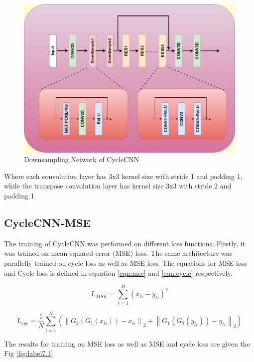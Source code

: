 \begin{figure}[H]
    \centering
    \includegraphics[totalheight=4.5in]{Chapter6/dd_1.png}
    \caption[Downsampling Network of CycleCNN.]{Downsampling Network of CycleCNN}
    \label{fig:label6.2}
\end{figure}
Where each convolution layer has 3x3 kernel size with stride 1 and padding 1, while the transpose convolution layer has kernel size 3x3 with stride 2 and padding 1. 
\subsection{CycleCNN-MSE}
The training of CycleCNN was performed on different loss functions. Firstly, it was trained on mean-squared error (MSE) loss. The same architecture was parallelly trained on cycle loss as well as MSE loss. The equations for MSE loss and Cycle loss is defined in equation \ref{eqn:mse} and \ref{eqn:cycle} respectively.

\begin{equation*}\label{eqn:mse}
{L_{MSE}} = \sum_{i=1}^{D}(x_{ti}-y_{ti})^2 \tag{5.1}\end{equation*}


\begin{equation*}
\label{eqn:cycle}
{L_{cyc}} = \frac{1}{N}\sum\limits_{i = 1}^N {\left( {{{\left\| {{G_2}({G_1}({x_{ti}})) - {x_{ti}}} \right\|}_2} + {{\left\| {{G_1}({G_2}({y_{ti}})) - {y_{ti}}} \right\|}_2}} \right)} \tag{5.2} \end{equation*}


The results for training on MSE loss as well as MSE and cycle loss are given the Fig 
\ref{fig:label7.1}


